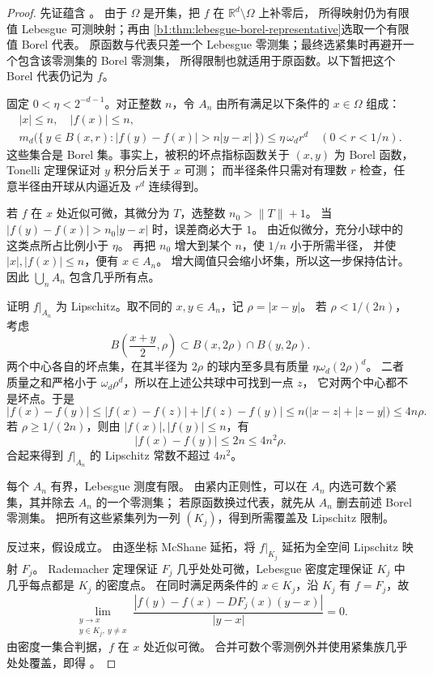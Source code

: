 \begin{proof}
先证蕴含%
。
由于 \(\Omega\) 是开集，把 \(f\) 在 \(\mathbb R^d\setminus\Omega\) 上补零后，
所得映射仍为有限值 Lebesgue 可测映射；再由
\cref{b1:thm:lebesgue-borel-representative}选取一个有限值 Borel 代表。
原函数与代表只差一个 Lebesgue 零测集；最终选紧集时再避开一个包含该零测集的 Borel 零测集，
所得限制也就适用于原函数。以下暂把这个 Borel 代表仍记为 \(f\)。

固定 \(0<\eta<2^{-d-1}\)。对正整数 \(n\)，令 \(A_n\) 由所有满足以下条件的
\(x\in\Omega\) 组成：
\[
 \begin{gathered}
 |x|\leq n,\quad |f(x)|\leq n,\\
 m_d\bigl(\{\,y\in B(x,r):
       |f(y)-f(x)|>n|y-x|\,\}\bigr)
 \leq\eta\,\omega_d r^d
 \quad(0<r<1/n).
 \end{gathered}
\]
这些集合是 Borel 集。事实上，被积的坏点指标函数关于 \((x,y)\) 为 Borel 函数，
Tonelli 定理保证对 \(y\) 积分后关于 \(x\) 可测；
而半径条件只需对有理数 \(r\) 检查，任意半径由开球从内逼近及 \(r^d\) 连续得到。

若 \(f\) 在 \(x\) 处近似可微，其微分为 \(T\)，选整数 \(n_0>\|T\|+1\)。
当 \(|f(y)-f(x)|>n_0|y-x|\) 时，误差商必大于 \(1\)。
由近似微分，充分小球中的这类点所占比例小于 \(\eta\)。
再把 \(n_0\) 增大到某个 \(n\)，使 \(1/n\) 小于所需半径，
并使 \(|x|,|f(x)|\leq n\)，便有 \(x\in A_n\)。
增大阈值只会缩小坏集，所以这一步保持估计。
因此 \(\bigcup_n A_n\) 包含几乎所有点。

证明 \(f|_{A_n}\) 为 Lipschitz。取不同的 \(x,y\in A_n\)，记 \(\rho=|x-y|\)。
若 \(\rho<1/(2n)\)，考虑
\[
 B\left(\frac{x+y}{2},\rho\right)
 \subset B(x,2\rho)\cap B(y,2\rho).
\]
两个中心各自的坏点集，在其半径为 \(2\rho\) 的球内至多具有质量
\(\eta\omega_d(2\rho)^d\)。
二者质量之和严格小于 \(\omega_d\rho^d\)，所以在上述公共球中可找到一点 \(z\)，
它对两个中心都不是坏点。于是
\[
 |f(x)-f(y)|
 \leq|f(x)-f(z)|+|f(z)-f(y)|
 \leq n\bigl(|x-z|+|z-y|\bigr)
 \leq4n\rho.
\]
若 \(\rho\geq1/(2n)\)，则由 \(|f(x)|,|f(y)|\leq n\)，有
\[
 |f(x)-f(y)|\leq2n\leq4n^2\rho.
\]
合起来得到 \(f|_{A_n}\) 的 Lipschitz 常数不超过 \(4n^2\)。

每个 \(A_n\) 有界，Lebesgue 测度有限。
由紧内正则性，可以在 \(A_n\) 内选可数个紧集，其并除去 \(A_n\) 的一个零测集；
若原函数换过代表，就先从 \(A_n\) 删去前述 Borel 零测集。
把所有这些紧集列为一列 \((K_j)\)，得到所需覆盖及 Lipschitz 限制。

反过来，假设成立。
由逐坐标 McShane 延拓，将 \(f|_{K_j}\) 延拓为全空间 Lipschitz 映射 \(F_j\)。
Rademacher 定理保证 \(F_j\) 几乎处处可微，Lebesgue 密度定理保证
\(K_j\) 中几乎每点都是 \(K_j\) 的密度点。
在同时满足两条件的 \(x\in K_j\)，沿 \(K_j\) 有 \(f=F_j\)，故
\[
 \lim_{\substack{y\to x\\y\in K_j,\ y\ne x}}
 \frac{|f(y)-f(x)-DF_j(x)(y-x)|}{|y-x|}=0.
\]
由密度一集合判据，\(f\) 在 \(x\) 处近似可微。
合并可数个零测例外并使用紧集族几乎处处覆盖，即得%
。
\end{proof}

